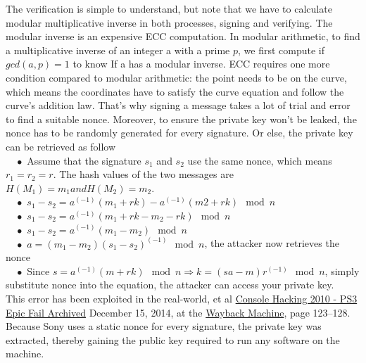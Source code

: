 The verification is simple to understand, but note that we have to calculate modular multiplicative inverse in both processes, signing and verifying. The modular inverse is an expensive ECC computation. In modular arithmetic, to find a multiplicative inverse of an integer a with a prime $p$, we first compute if $gcd(a, p) = 1$ to know If a has a modular inverse. ECC requires one more condition compared to modular arithmetic: the point needs to be on the curve, which means the coordinates have to satisfy the curve equation and follow the curve’s addition law. That’s why signing a message takes a lot of trial and error to find a suitable nonce. Moreover, to ensure the private key won’t be leaked, the nonce has to be randomly generated for every signature. Or else, the private key can be retrieved as follow\\
$\quad\bullet$ Assume that the signature $s_1$ and $s_2$ use the same nonce, which means $r_1 = r_2 = r$. The hash values of the two messages are $H(M_1) = m_1 and H(M_2) = m_2$.\\
$\quad\bullet$ $s_1 - s_2 = a^(-1) (m_1 + rk) - a^(-1) (m2+rk) \mod n$\\
$\quad\bullet$ $s_1 - s_2 = a^(-1)(m_1 + rk - m_2 - rk) \mod n$\\
$\quad\bullet$ $s_1 - s_2 = a^(-1)(m_1 - m_2) \mod n$\\
$\quad\bullet$ $a = (m_1 - m_2)(s_1 - s_2)^(-1) \mod n$, the attacker now retrieves the nonce\\
$\quad\bullet$ Since $s = a^(-1)(m + rk) \mod n \Rightarrow k = (sa-m) r^(-1) \mod n$, simply substitute nonce into the equation, the attacker can access your private key.\\

This error has been exploited in the real-world, et al \href{https://events.ccc.de/congress/2010/Fahrplan/attachments/1780_27c3_console_hacking_2010.pdf}{Console Hacking 2010 - PS3 Epic Fail Archived} December 15, 2014, at the \href{https://en.wikipedia.org/wiki/Wayback_Machine}{Wayback Machine}, page 123–128. Because Sony uses a static nonce for every signature, the private key was extracted, thereby gaining the public key required to run any software on the machine.\\

